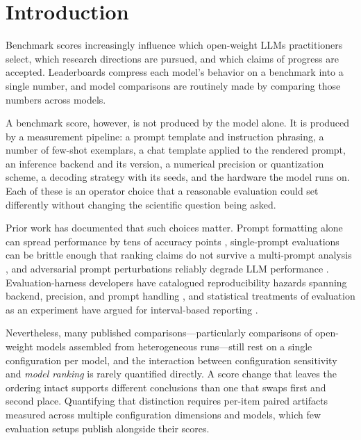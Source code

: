 \section{Introduction}
\label{sec:intro}

Benchmark scores increasingly influence which open-weight LLMs practitioners
select, which research directions are pursued, and which claims of progress
are accepted. Leaderboards compress each model's behavior on a benchmark
into a single number, and model comparisons are routinely made by comparing
those numbers across models.

A benchmark score, however, is not produced by the model alone. It is
produced by a measurement pipeline: a prompt template and instruction
phrasing, a number of few-shot exemplars, a chat template applied to the
rendered prompt, an inference backend and its version, a numerical precision
or quantization scheme, a decoding strategy with its seeds, and the hardware
the model runs on. Each of these is an operator choice that a reasonable
evaluation could set differently without changing the scientific question
being asked.

Prior work has documented that such choices matter. Prompt formatting alone
can spread performance by tens of accuracy points
\citep{sclar2024quantifying}, single-prompt evaluations can be brittle
enough that ranking claims do not survive a multi-prompt analysis
\citep{mizrahi2024state}, and adversarial prompt perturbations reliably
degrade LLM performance \citep{zhu2024promptrobust}. Evaluation-harness
developers have catalogued reproducibility hazards spanning backend,
precision, and prompt handling \citep{biderman2024lessons}, and statistical
treatments of evaluation as an experiment have argued for interval-based
reporting \citep{miller2024adding}.

Nevertheless, many published comparisons---particularly comparisons of
open-weight models assembled from heterogeneous runs---still rest on a
single configuration per model, and the interaction between configuration
sensitivity and \emph{model ranking} is rarely quantified directly. A score
change that leaves the ordering intact supports different conclusions than
one that swaps first and second place. Quantifying that distinction requires
per-item paired artifacts measured across multiple configuration dimensions
and models, which few evaluation setups publish alongside their scores.


